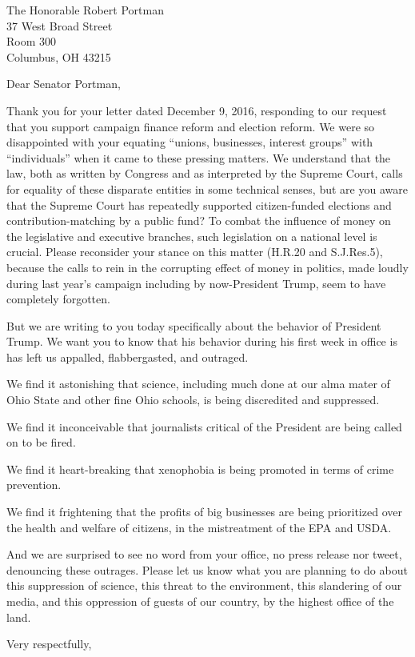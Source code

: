 \documentclass{letter}
\begin{document}
\begin{letter}{
  The Honorable Robert Portman \\
  37 West Broad Street \\
  Room 300 \\
  Columbus, OH 43215}

\opening{Dear Senator Portman,}

Thank you for your letter dated December 9, 2016, responding to our request that you support campaign finance reform and election reform. We were so disappointed with your equating ``unions, businesses, interest groups'' with ``individuals'' when it came to these pressing matters. We understand that the law, both as written by Congress and as interpreted by the Supreme Court, calls for equality of these disparate entities in some technical senses, but are you aware that the Supreme Court has repeatedly supported citizen-funded elections and contribution-matching by a public fund? To combat the influence of money on the legislative and executive branches, such legislation on a national level is crucial. Please reconsider your stance on this matter (H.R.20 and S.J.Res.5), because the calls to rein in the corrupting effect of money in politics, made loudly during last year's campaign including by now-President Trump, seem to have completely forgotten.

But we are writing to you today specifically about the behavior of President Trump. We want you to know that his behavior during his first week in office is has left us appalled, flabbergasted, and outraged.

We find it astonishing that science, including much done at our alma mater of Ohio State and other fine Ohio schools, is being discredited and suppressed.

We find it inconceivable that journalists critical of the President are being called on to be fired.

We find it heart-breaking that xenophobia is being promoted in terms of crime prevention.

We find it frightening that the profits of big businesses are being prioritized over the health and welfare of citizens, in the mistreatment of the EPA and USDA.

And we are surprised to see no word from your office, no press release nor tweet, denouncing these outrages. Please let us know what you are planning to do about this suppression of science, this threat to the environment, this slandering of our media, and this oppression of guests of our country, by the highest office of the land.

\closing{Very respectfully,}


\end{letter}
\end{document}

